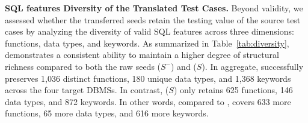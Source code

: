 \documentclass[sigconf,review,anonymous]{acmart}
\begin{document}
\textbf{SQL features Diversity of the Translated Test Cases.}
Beyond validity, we assessed whether the transferred seeds retain the testing value of the source test cases by analyzing the diversity of valid SQL features across three dimensions: functions, data types, and keywords. 
As summarized in Table~\ref{tab:diversity}, \tool{} demonstrates a consistent ability to maintain a higher degree of structural richness compared to both the raw seeds ($S^-$) and \sedar{} ($S$). 
In aggregate, \tool{} successfully preserves 1,036 distinct functions, 180 unique data types, and 1,368 keywords across the four target DBMSs. 
In contrast, \sedar{} ($S$) only retains 625 functions, 146 data types, and 872 keywords. 
In other words, compared to \sedar, \tool{} covers 633 more functions, 65 more data types, and 616 more keywords.


\begin{table}[!htbp]
\centering %
\small     %
\caption{Statistics of valid SQL features (Functions, Data Types, Keywords) in the transferred seeds.}
\label{tab:diversity}
\renewcommand\arraystretch{1}
\end{table}
\end{document}
